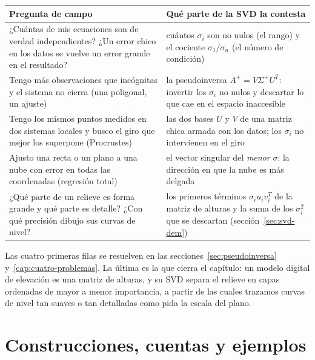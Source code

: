 {\small
\begin{center}
\begin{tabularx}{.94\textwidth}{>{\raggedright\arraybackslash}p{} Y}
\toprule
Pregunta de campo & Qué parte de la SVD la contesta\\
\midrule
¿Cuántas de mis ecuaciones son de verdad independientes? ¿Un error chico en los datos se
vuelve un error grande en el resultado? &
cuántos \(\sigma_i\) son no nulos (el rango) y el cociente \(\sigma_1/\sigma_n\) (el
número de condición)\\
Tengo más observaciones que incógnitas y el sistema no cierra (una poligonal, un ajuste) &
la pseudoinversa \(A^{+}=V\Sigma^{+}U^T\): invertir los \(\sigma_i\) no nulos y descartar
lo que cae en el espacio inaccesible\\
Tengo los mismos puntos medidos en dos sistemas locales y busco el giro que mejor los
superpone (Procrustes) &
las dos bases \(U\) y \(V\) de una matriz chica armada con los datos; los \(\sigma_i\) no
intervienen en el giro\\
Ajusto una recta o un plano a una nube con error en todas las coordenadas (regresión total) &
el vector singular del \emph{menor} \(\sigma\): la dirección en que la nube es más delgada\\
¿Qué parte de un relieve es forma grande y qué parte es detalle? ¿Con qué precisión dibujo
sus curvas de nivel? &
los primeros términos \(\sigma_iu_iv_i^T\) de la matriz de alturas y la suma de los
\(\sigma_i^2\) que se descartan (sección~\ref{sec:svd-dem})\\
\bottomrule
\end{tabularx}
\end{center}
}

Las cuatro primeras filas se resuelven en las secciones~\ref{sec:pseudoinversa}
y~\ref{cap:cuatro-problemas}. La última es la que cierra el capítulo: un modelo digital de
elevación es una matriz de alturas, y su SVD separa el relieve en capas ordenadas de mayor
a menor importancia, a partir de las cuales trazamos curvas de nivel tan suaves o tan
detalladas como pida la escala del plano.


\section{Construcciones, cuentas y ejemplos}


